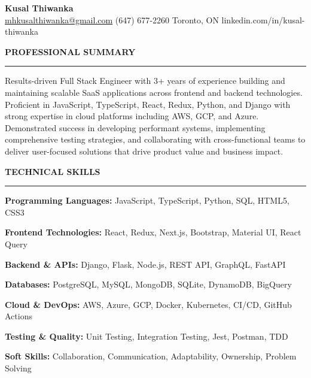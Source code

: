 \documentclass[10pt,letterpaper]{article}
\begin{document}
\begin{center}
{\LARGE\textbf{Kusal Thiwanka}}\\[3pt]
\href{mailto:mhkusalthiwanka@gmail.com}{mhkusalthiwanka@gmail.com}\hspace{2em}%
(647) 677{-}2260\hspace{2em}%
Toronto, ON\hspace{2em}
linkedin.com/in/kusal-thiwanka
\end{center}

\vspace{6pt}

\textbf{PROFESSIONAL SUMMARY}\\[-8pt]
\noindent\rule{\textwidth}{1pt}

\vspace{-2pt}

Results-driven Full Stack Engineer with 3+ years of experience building and maintaining scalable SaaS applications across frontend and backend technologies. Proficient in JavaScript, TypeScript, React, Redux, Python, and Django with strong expertise in cloud platforms including AWS, GCP, and Azure. Demonstrated success in developing performant systems, implementing comprehensive testing strategies, and collaborating with cross-functional teams to deliver user-focused solutions that drive product value and business impact.

\vspace{8pt}

\textbf{TECHNICAL SKILLS}\\[-8pt]
\noindent\rule{\textwidth}{1pt}

\vspace{-2pt}

\textbf{Programming Languages:} JavaScript, TypeScript, Python, SQL, HTML5, CSS3

\textbf{Frontend Technologies:} React, Redux, Next.js, Bootstrap, Material UI, React Query

\textbf{Backend \& APIs:} Django, Flask, Node.js, REST API, GraphQL, FastAPI

\textbf{Databases:} PostgreSQL, MySQL, MongoDB, SQLite, DynamoDB, BigQuery

\textbf{Cloud \& DevOps:} AWS, Azure, GCP, Docker, Kubernetes, CI/CD, GitHub Actions

\textbf{Testing \& Quality:} Unit Testing, Integration Testing, Jest, Postman, TDD

\textbf{Soft Skills:} Collaboration, Communication, Adaptability, Ownership, Problem Solving
\end{document}
